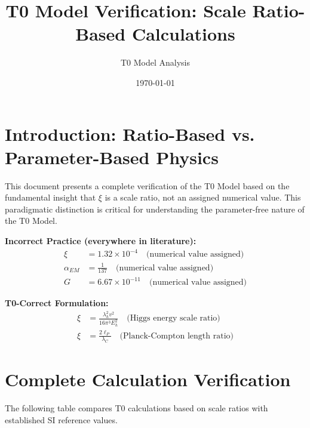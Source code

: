 \documentclass[12pt,a4paper]{article}
\title{T0 Model Verification: Scale Ratio-Based Calculations}
\author{T0 Model Analysis}
\date{\today}
\begin{document}
	
	\maketitle
	
	\section{Introduction: Ratio-Based vs. Parameter-Based Physics}
	
	This document presents a complete verification of the T0 Model based on the fundamental insight that $\xi$ is a scale ratio, not an assigned numerical value. This paradigmatic distinction is critical for understanding the parameter-free nature of the T0 Model.
	
	\begin{tcolorbox}[colback=red!5!white,colframe=red!75!black,title=Fundamental Literature Error]
		\textbf{Incorrect Practice (everywhere in literature):}
		\begin{align}
			\xi &= 1.32 \times 10^{-4} \quad \text{(numerical value assigned)} \\
			\alpha_{EM} &= \frac{1}{137} \quad \text{(numerical value assigned)} \\
			G &= 6.67 \times 10^{-11} \quad \text{(numerical value assigned)}
		\end{align}
		
		\textbf{T0-Correct Formulation:}
		\begin{align}
			\xi &= \frac{\lambda_h^2 v^2}{16\pi^3 E_h^2} \quad \text{(Higgs energy scale ratio)} \\
			\xi &= \frac{2\ell_P}{\lambda_C} \quad \text{(Planck-Compton length ratio)}
		\end{align}
	\end{tcolorbox}
	
	\section{Complete Calculation Verification}
	
	The following table compares T0 calculations based on scale ratios with established SI reference values.
	
\end{document}
